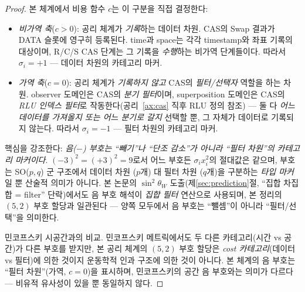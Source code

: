\documentclass[entropy,article,submit,pdftex,oneauthor]{Definitions/mdpi}
\begin{document}
\begin{proof}
본 체계에서 비용 함수 $c$는 이 구분을 직접 결정한다:
\begin{itemize}
\item \emph{비가역 축}($c > 0$): 공리 체계가 \emph{기록}하는 데이터 차원. CAS의 Swap 결과가 DATA 슬롯에 영구히 등록된다. time과 space는 각각 timestamp와 좌표 기록의 대상이며, R/C/S CAS 단계는 그 기록을 \emph{수행}하는 비가역 단계들이다. 따라서 $\sigma_i = +1$ --- 데이터 차원의 카테고리 마커.
\item \emph{가역 축}($c = 0$): 공리 체계가 \emph{기록하지 않고} CAS의 \emph{필터/선택자} 역할을 하는 차원. observer 도메인은 CAS의 \emph{분기 필터}이며, superposition 도메인은 CAS의 \emph{RLU 인덱스 필터}로 작동한다(공리~\ref{ax:cas} 직후 RLU 정의 참조) --- 둘 다 \emph{어느 데이터를 가져올지 또는 어느 분기로 갈지} 선택할 뿐, 그 자체가 데이터로 기록되지 않는다. 따라서 $\sigma_i = -1$ --- 필터 차원의 카테고리 마커.
\end{itemize}

핵심을 강조한다: \emph{음($-$) 부호는 ``빼기''나 ``단조 감소''가 아니라 ``필터 차원''의 카테고리 마커이다}. $(-3)^2 = (+3)^2 = 9$로서 어느 부호든 $\sigma_i x_i^2$의 절대값은 같으며, 부호는 SO($p,q$) 군 구조에서 데이터 차원 ($p$개) 대 필터 차원 ($q$개)을 구분하는 \emph{타입 마커}일 뿐 산술적 의미가 아니다. 본 논문의 $\sin^2\theta_W$ 도출(제\ref{sec:prediction}절, ``집합 차집합 = filter'' 단락)에서도 음 부호 해석이 \emph{집합 필터} 연산으로 사용되며, 본 정리의 $(5,2)$ 부호 할당과 일관된다 --- 양쪽 모두에서 음 부호는 ``뺄셈''이 아니라 ``필터/선택''을 의미한다.

민코프스키 시공간과의 비교. 민코프스키 메트릭에서도 두 다른 카테고리(시간 vs 공간)가 다른 부호를 받지만, 본 공리 체계의 $(5, 2)$ 부호 할당은 \emph{cost 카테고리}(데이터 vs 필터)에 의한 것이지 운동학적 인과 구조에 의한 것이 아니다. 본 체계의 음 부호는 ``필터 차원''(가역, $c = 0$)을 표시하며, 민코프스키의 공간 음 부호와는 의미가 다르다 --- 비유적 유사성이 있을 뿐 동일하지 않다.


\end{proof}
\end{document}
